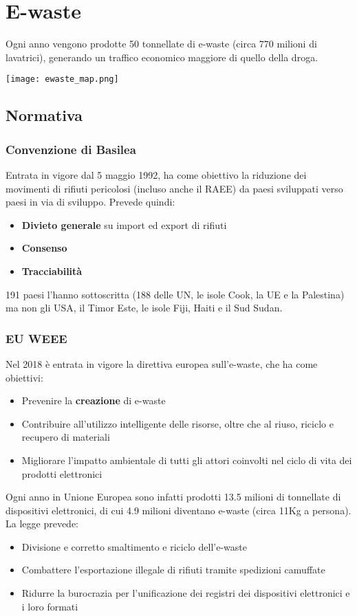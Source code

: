\newpage
\section{E-waste}
Ogni anno vengono prodotte 50 tonnellate di e-waste (circa 770 milioni di lavatrici), generando un traffico economico maggiore di quello della droga.
\begin{center}
	\texttt{[image: ewaste\_map.png]}
\end{center}

\subsection{Normativa}
\subsubsection{Convenzione di Basilea}
Entrata in vigore dal 5 maggio 1992, ha come obiettivo la riduzione dei movimenti di rifiuti pericolosi (incluso anche il RAEE) da paesi sviluppati verso paesi in via di sviluppo. Prevede quindi:
\begin{itemize}
	\item \textbf{Divieto generale} su import ed export di rifiuti
	\item \textbf{Consenso}
	\item \textbf{Tracciabilità}
\end{itemize}
191 paesi l'hanno sottoscritta (188 delle UN, le isole Cook, la UE e la Palestina) ma non gli USA, il Timor Este, le isole Fiji, Haiti e il Sud Sudan.

\subsubsection{EU WEEE}
Nel 2018 è entrata in vigore la direttiva europea sull'e-waste, che ha come obiettivi:
\begin{itemize}
	\item Prevenire la \textbf{creazione} di e-waste
	\item Contribuire all'utilizzo intelligente delle risorse, oltre che al riuso, riciclo e recupero di materiali
	\item Migliorare l'impatto ambientale di tutti gli attori coinvolti nel ciclo di vita dei prodotti elettronici
\end{itemize}
Ogni anno in Unione Europea sono infatti prodotti 13.5 milioni di tonnellate di dispositivi elettronici, di cui 4.9 milioni diventano e-waste (circa 11Kg a persona).\\
La legge prevede:
\begin{itemize}
	\item Divisione e corretto smaltimento e riciclo dell'e-waste
	\item Combattere l'esportazione illegale di rifiuti tramite spedizioni camuffate
	\item Ridurre la burocrazia per l'unificazione dei registri dei dispositivi elettronici e i loro formati
\end{itemize}


